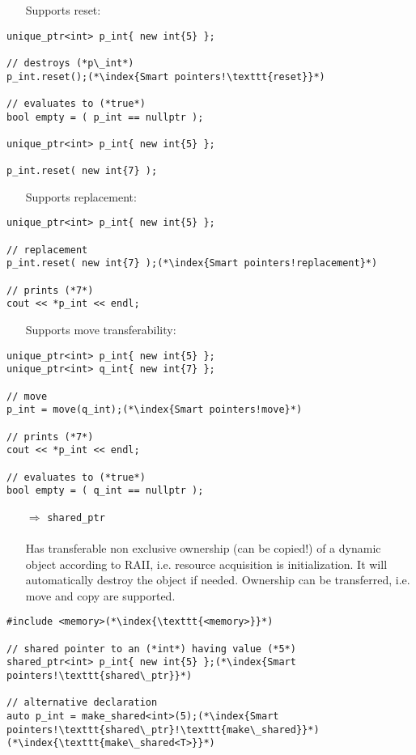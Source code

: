 \documentclass[10pt]{article}
\begin{document}
\begin{enumerate}
\item[] Supports reset:
\end{enumerate}
\begin{lstlisting}
unique_ptr<int> p_int{ new int{5} };

// destroys (*p\_int*)    
p_int.reset();(*\index{Smart pointers!\texttt{reset}}*)

// evaluates to (*true*)
bool empty = ( p_int == nullptr );

unique_ptr<int> p_int{ new int{5} };

p_int.reset( new int{7} );
\end{lstlisting}
\begin{enumerate}
\item[] Supports replacement:
\end{enumerate}
\begin{lstlisting}
unique_ptr<int> p_int{ new int{5} };

// replacement
p_int.reset( new int{7} );(*\index{Smart pointers!replacement}*)

// prints (*7*)
cout << *p_int << endl;
\end{lstlisting}
\begin{enumerate}
\item[] Supports move transferability:
\end{enumerate}
\begin{lstlisting}
unique_ptr<int> p_int{ new int{5} };
unique_ptr<int> q_int{ new int{7} };

// move
p_int = move(q_int);(*\index{Smart pointers!move}*)

// prints (*7*)
cout << *p_int << endl;

// evaluates to (*true*)
bool empty = ( q_int == nullptr );
\end{lstlisting}
\begin{enumerate}
\item[$\Rightarrow$] \texttt{shared\_ptr}\\ \\
Has transferable non exclusive ownership (can be copied!) of a dynamic object according to RAII, i.e. resource acquisition is initialization. It will 
automatically destroy the object if needed. Ownership can be transferred, i.e. move and copy are supported. 
\end{enumerate}
\begin{lstlisting}
#include <memory>(*\index{\texttt{<memory>}}*)

// shared pointer to an (*int*) having value (*5*)
shared_ptr<int> p_int{ new int{5} };(*\index{Smart pointers!\texttt{shared\_ptr}}*)

// alternative declaration
auto p_int = make_shared<int>(5);(*\index{Smart pointers!\texttt{shared\_ptr}!\texttt{make\_shared}}*)(*\index{\texttt{make\_shared<T>}}*)
\end{lstlisting}
\end{document}
